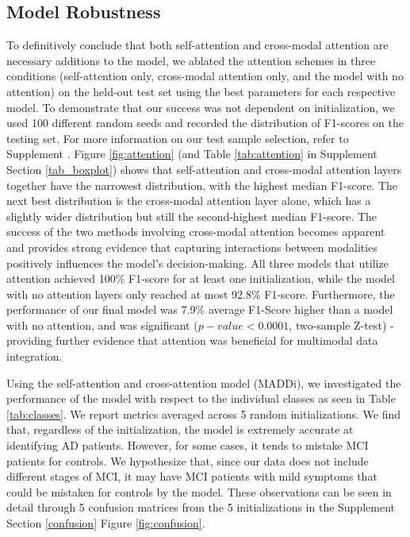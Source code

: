 \documentclass[11pt]{article}
\begin{document}
\subsection*{Model Robustness}
\label{subsection:robust}
To definitively conclude that both self-attention and cross-modal attention are necessary additions to the model, we ablated the attention schemes in three conditions (self-attention only, cross-modal attention only, and the model with no attention) on the held-out test set using the best parameters for each respective model. To demonstrate that our success was not dependent on initialization, we used 100 different random seeds and recorded the distribution of F1-scores on the testing set. For more information on our test sample selection, refer to Supplement \label{section:samp_sel}. Figure \ref{fig:attention} (and Table \ref{tab:attention} in Supplement Section \ref{tab_boxplot}) shows that self-attention and cross-modal attention layers together have the narrowest distribution, with the highest median F1-score. The next best distribution is the cross-modal attention layer alone, which has a slightly wider distribution but still the second-highest median F1-score. The success of the two methods involving cross-modal attention becomes apparent and provides strong evidence that capturing interactions between modalities positively influences the model’s decision-making. All three models that utilize attention achieved 100\% F1-score for at least one initialization, while the model with no attention layers only reached at most 92.8\% F1-score. Furthermore, the performance of our final model was 7.9\% average F1-Score higher than a model with no attention, and was significant ($p-value<0.0001$, two-sample Z-test) - providing further evidence that attention was beneficial for multimodal data integration.

Using the self-attention and cross-attention model (MADDi), we investigated the performance of the model with respect to the individual classes as seen in Table \ref{tab:classes}. We report metrics averaged across 5 random initializations. We find that, regardless of the initialization,  the model is extremely accurate at identifying AD patients. However, for some cases, it tends to mistake MCI patients for controls. We hypothesize  that, since our data does not include different stages of MCI, it may have MCI patients with mild symptoms that could be mistaken for controls by the model. These observations can be seen in detail through 5 confusion matrices from the 5 initializations in the Supplement Section \ref{confusion} Figure \ref{fig:confusion}.
\end{document}
